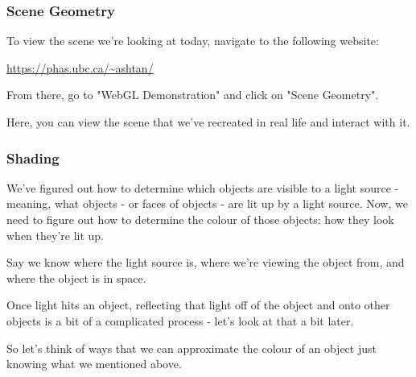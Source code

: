 \documentclass[12pt]{beamer}
\begin{document}
  \begin{frame}
    \frametitle{Scene Geometry}



    To view the scene we're looking at today, navigate to the following website:

    \url{https://phas.ubc.ca/~ashtan/}

    From there, go to "WebGL Demonstration" and click on "Scene Geometry".

    Here, you can view the scene that we've recreated in real life and interact with it.

  \end{frame}


  \begin{frame}
    \frametitle{Shading}
    We've figured out how to determine which objects are visible to a light source - meaning, what objects - or faces of objects - are lit up by a light source.
    Now, we need to figure out how to determine the colour of those objects: how they look when they're lit up.

    Say we know where the light source is, where we're viewing the object from, and where the object is in space.

    Once light hits an object, reflecting that light off of the object and onto other objects is a bit of a complicated process - let's look at that a bit later.

    So let's think of ways that we can approximate the colour of an object just knowing what we mentioned above.

  \end{frame}
\end{document}

